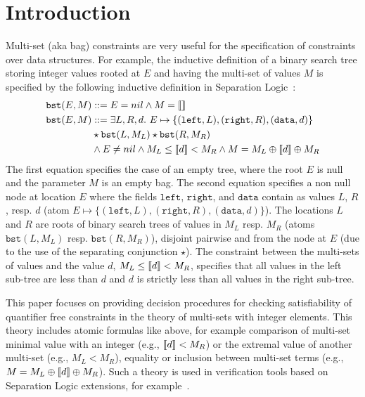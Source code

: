 
\section{Introduction}
\label{sec:intro}

Multi-set (aka bag) constraints are very useful for the specification of constraints over data structures.
For example, the inductive definition of a binary search tree storing integer values rooted at $E$ and having the multi-set of values $M$ is
specified by the following inductive definition in Separation Logic~\cite{EneaSW15}:
\begin{align}
\mathtt{bst}(E,M) &::= E = nil \land M=\llbracket  \rrbracket \\
\mathtt{bst}(E,M) &::= \exists L, R, d.\ E\mapsto \{(\mathtt{left},L), (\mathtt{right}, R), (\mathtt{data}, d)\}  \\
& \star \mathtt{bst}(L, M_L) \star \mathtt{bst}(R,M_R) \nonumber \\
& \land E\neq nil \land M_L \le \llbracket d \rrbracket < M_R \land M=M_L \oplus \llbracket d \rrbracket \oplus M_R \nonumber
\end{align}
The first equation specifies the case of an empty tree, where the root $E$ is null and the parameter $M$ is an empty bag.
The second equation specifies a non null node at location $E$ where the fields $\mathtt{left}$, $\mathtt{right}$, and $\mathtt{data}$ contain as values
$L$, $R$, resp. $d$ (atom $E\mapsto \{(\mathtt{left},L), (\mathtt{right}, R), (\mathtt{data}, d)\}$).
The locations $L$ and $R$ are roots of binary search trees of values in $M_L$ resp. $M_R$ (atoms $ \mathtt{bst}(L, M_L)$ resp.  $\mathtt{bst}(R,M_R)$),
disjoint pairwise and from the node at $E$ (due to the use of the separating conjunction $\star$).
The constraint between the multi-sets of values and the value $d$, $M_L \le \llbracket d \rrbracket < M_R$, specifies that
all values in the left sub-tree are less than $d$ and $d$ is strictly less than all values in the right sub-tree. 

This paper focuses on providing decision procedures for checking satisfiability of quantifier free constraints in the theory of multi-sets with integer elements.
This theory includes atomic formulas like above, for example comparison of multi-set minimal value with an integer (e.g., $\llbracket d \rrbracket < M_R$) or the extremal value of another multi-set (e.g., $M_L < M_R$),
equality or inclusion between multi-set terms (e.g., $M=M_L \oplus \llbracket d \rrbracket \oplus M_R$). 
Such a theory is used in verification tools based on Separation Logic extensions, for example~\cite{EneaSW15,verifast}.

